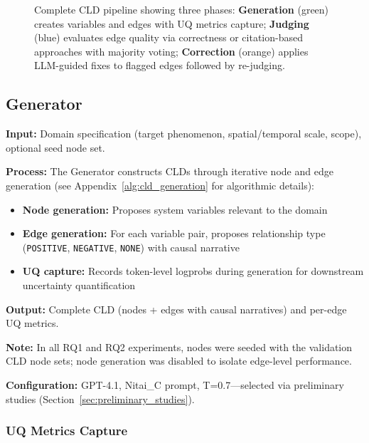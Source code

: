 \begin{figure}[H]
\centering
\resizebox{\textwidth}{!}{%

}
\caption{Complete CLD pipeline showing three phases: \textbf{Generation} (green) creates variables and edges with UQ metrics capture; \textbf{Judging} (blue) evaluates edge quality via correctness or citation-based approaches with majority voting; \textbf{Correction} (orange) applies LLM-guided fixes to flagged edges followed by re-judging.}
\label{fig:cld_pipeline}
\end{figure}

\subsection{Generator}
\label{sec:generator}

\textbf{Input:} Domain specification (target phenomenon, spatial/temporal scale, scope), optional seed node set.

\textbf{Process:} The Generator constructs CLDs through iterative node and edge generation (see Appendix~\ref{alg:cld_generation} for algorithmic details):
\begin{itemize}[noitemsep]
    \item \textbf{Node generation:} Proposes system variables relevant to the domain
    \item \textbf{Edge generation:} For each variable pair, proposes relationship type (\texttt{POSITIVE}, \texttt{NEGATIVE}, \texttt{NONE}) with causal narrative
    \item \textbf{UQ capture:} Records token-level logprobs during generation for downstream uncertainty quantification
\end{itemize}

\textbf{Output:} Complete CLD (nodes + edges with causal narratives) and per-edge UQ metrics.

\textbf{Note:} In all RQ1 and RQ2 experiments, nodes were seeded with the validation CLD node sets; node generation was disabled to isolate edge-level performance.

\textbf{Configuration:} GPT-4.1, Nitai\_C prompt, T=0.7---selected via preliminary studies (Section~\ref{sec:preliminary_studies}).

\subsubsection{UQ Metrics Capture}
\label{sec:uq_metrics_definition}

